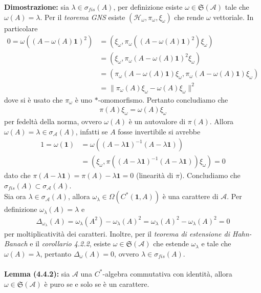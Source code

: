 \documentclass{article}
\numberwithin{equation}{subsection}
\begin{document}
\textbf{Dimostrazione:} sia $\lambda \in \sigma_{fis}(A)$, per definizione esiste $\omega \in \mathfrak{S}(\mathscr{A})$ tale che $\omega(A) = \lambda$. Per il \textit{teorema GNS} esiste $(\mathcal{H}_\omega, \pi_\omega, \xi_\omega)$ che rende $\omega$ vettoriale. In particolare
\begin{align*}
    0 = \omega((A - \omega(A)\mathbf{1})^2) &= (\xi_\omega, \pi_\omega((A - \omega(A)\mathbf{1})^2)\xi_\omega) \\
    &= (\xi_\omega, \pi_\omega(A - \omega(A)\mathbf{1})^2\xi_\omega) \\
    &= (\pi_\omega(A - \omega(A)\mathbf{1})\xi_\omega, \pi_\omega(A - \omega(A)\mathbf{1})\xi_\omega) \\
    &= \|\pi_\omega(A)\xi_\omega - \omega(A)\xi_\omega\|^2
\end{align*}
dove si è usato che $\pi_\omega$ è uno $*$-omomorfismo. Pertanto concludiamo che 
\begin{align*}
    \pi(A)\xi_\omega = \omega(A)\xi_\omega
\end{align*}
per fedeltà della norma, ovvero $\omega(A)$ è un autovalore di $\pi(A)$. Allora $\omega(A) = \lambda \in \sigma_\mathscr{A}(A)$, infatti se $A$ fosse invertibile si avrebbe
\begin{align*}
    1 = \omega(\mathbf{1}) &= \omega((A - \lambda\mathbf{1})^{-1}(A - \lambda\mathbf{1})) \\
    &= (\xi_\omega, \pi((A - \lambda\mathbf{1})^{-1}(A - \lambda\mathbf{1}))\xi_\omega) = 0
\end{align*}
dato che $\pi(A - \lambda\mathbf{1}) = \pi(A) - \lambda\mathbf{1} = 0$ (linearità di $\pi$). Concludiamo che $\sigma_{fis}(A) \subset \sigma_\mathscr{A}(A)$. \\
Sia ora $\lambda \in \sigma_\mathscr{A}(A)$, allora $\omega_\lambda \in \Omega(C^*(\mathbf{1}, A))$ è una carattere di $\mathscr{A}$. Per definizione $\omega_\lambda(A) = \lambda$ e
\begin{align*}
    \Delta_{\omega_\lambda}(A) = \omega_\lambda(A^2) - \omega_\lambda(A)^2 = \omega_\lambda(A)^2 - \omega_\lambda(A)^2 = 0
\end{align*}
per moltiplicatività dei caratteri. Inoltre, per il \textit{teorema di estensione di Hahn-Banach} e il \textit{corollario 4.2.2}, esiste $\omega \in \mathfrak{S}(\mathscr{A})$ che estende $\omega_\lambda$ e tale che $\omega(A) = \lambda$, pertanto $\Delta_\omega(A) = 0$, ovvero $\lambda \in \sigma_{fis}(A)$. \\ \\
\textbf{Lemma (4.4.2):} sia $\mathscr{A}$ una $C^*$-algebra commutativa con identità, allora $\omega \in \mathfrak{S}(\mathscr{A})$ è puro se e solo se è un carattere. \\
\end{document}

